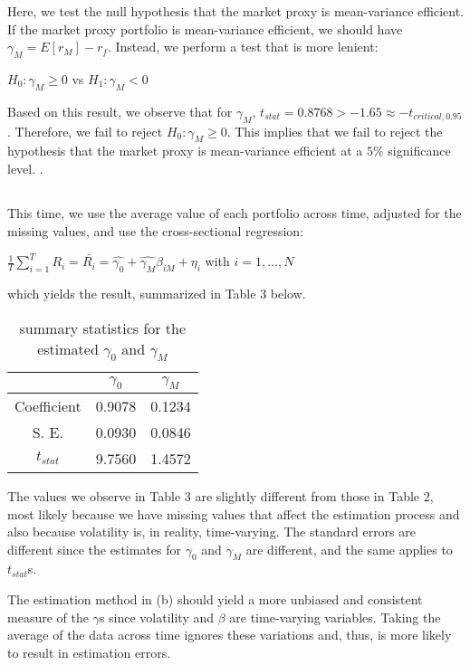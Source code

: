 \documentclass{report}
\begin{document}
Here, we test the null hypothesis that the market proxy is mean-variance efficient. If the market proxy portfolio is mean-variance efficient, we should have $\gamma_M = E[r_M] - r_f$. Instead, we perform a test that is more lenient:
\begin{center}
	$H_0: \gamma_M \geq 0$ vs $H_1: \gamma_M < 0$
\end{center}

Based on this result, we observe that for $\gamma_M$,  $t_{stat} = 0.8768 > -1.65 \approx -t_{critical, 0.95}$. Therefore, we fail to reject $H_0: \gamma_M \geq 0$. This implies that we fail to reject the hypothesis that the market proxy is mean-variance efficient at a $5\%$ significance level. .


\subsection{ }
This time, we use the average value of each portfolio across time, adjusted for the missing values, and use the cross-sectional regression:
\begin{center}
	$\frac{1}{T} \sum_{i = 1}^{T} R_i = \bar{R_i} = \hat{\gamma_0} + \hat{\gamma_M} \beta_{iM} + \eta_i$ with $i = 1, \dots, N$
\end{center}
which yields the result, summarized in Table 3 below.

\begin{table}[ht]
\centering
\caption{summary statistics for the estimated $\gamma_0$ and $\gamma_M$}
\begin{tabular}{c | c | c}
		& $\gamma_0$	& $\gamma_M$	\\	[0.5ex] 	\hline
Coefficient	& 0.9078		& 0.1234		\\
S. E.		& 0.0930		& 0.0846		\\
$t_{stat}$	& 9.7560		& 1.4572		\\ 	[0.5ex]	\hline \hline
\end{tabular}
\end{table}

The values we observe in Table 3 are slightly different from those in Table 2, most likely because we have missing values that affect the estimation process and also because volatility is, in reality, time-varying. The standard errors are different since the estimates for $\gamma_0$ and $\gamma_M$ are different, and the same applies to $t_{stat}$s.


The estimation method in (b) should yield a more unbiased and consistent measure of the $\gamma$s since volatility and $\beta$ are time-varying variables. 
Taking the average of the data across time ignores these variations and, thus, is more likely to result in estimation errors. 
\end{document}

